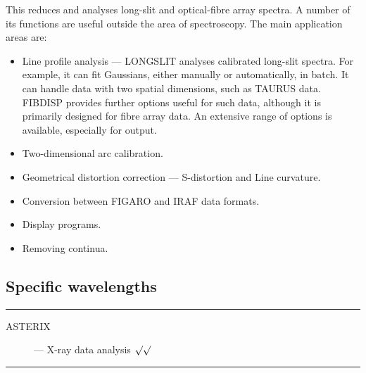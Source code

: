 \begin{description}
\begin{description}
This reduces and analyses long-slit and optical-fibre array spectra.
A number of its functions are useful outside the area of spectroscopy.
The main application areas are:
\begin{itemize}

\item Line profile analysis --- LONGSLIT analyses calibrated long-slit spectra.
For example, it can fit Gaussians, either manually or automatically, in batch.
It can handle data with two spatial dimensions, such as TAURUS data.
\mbox{FIBDISP} provides further options useful for such data, although it is
primarily designed for fibre array data.
An extensive range of options is available, especially for output.

\item Two-dimensional arc calibration.

\item Geometrical distortion correction --- S-distortion and Line curvature.

\item Conversion between FIGARO and IRAF data formats.

\item Display programs.
\item Removing continua.
\end{itemize}

\end{description}

\end{description}

\newpage

\subsection{Specific wavelengths}

\rule{\textwidth}{0.5mm}
\begin{description}
\begin{description}
\item [ASTERIX] --- X-ray data analysis \hfill $\surd\surd$
\end{description}
\end{description}
\rule{\textwidth}{0.5mm}

